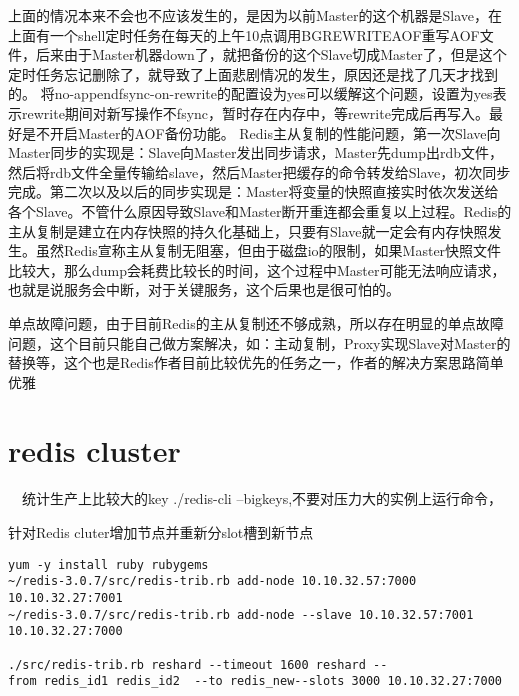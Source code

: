 上面的情况本来不会也不应该发生的，是因为以前Master的这个机器是Slave，在上面有一个shell定时任务在每天的上午10点调用BGREWRITEAOF重写AOF文件，后来由于Master机器down了，就把备份的这个Slave切成Master了，但是这个定时任务忘记删除了，就导致了上面悲剧情况的发生，原因还是找了几天才找到的。
将no-appendfsync-on-rewrite的配置设为yes可以缓解这个问题，设置为yes表示rewrite期间对新写操作不fsync，暂时存在内存中，等rewrite完成后再写入。最好是不开启Master的AOF备份功能。
Redis主从复制的性能问题，第一次Slave向Master同步的实现是：Slave向Master发出同步请求，Master先dump出rdb文件，然后将rdb文件全量传输给slave，然后Master把缓存的命令转发给Slave，初次同步完成。第二次以及以后的同步实现是：Master将变量的快照直接实时依次发送给各个Slave。不管什么原因导致Slave和Master断开重连都会重复以上过程。Redis的主从复制是建立在内存快照的持久化基础上，只要有Slave就一定会有内存快照发生。虽然Redis宣称主从复制无阻塞，但由于磁盘io的限制，如果Master快照文件比较大，那么dump会耗费比较长的时间，这个过程中Master可能无法响应请求，也就是说服务会中断，对于关键服务，这个后果也是很可怕的。

单点故障问题，由于目前Redis的主从复制还不够成熟，所以存在明显的单点故障问题，这个目前只能自己做方案解决，如：主动复制，Proxy实现Slave对Master的替换等，这个也是Redis作者目前比较优先的任务之一，作者的解决方案思路简单优雅


\section{redis cluster}

  统计生产上比较大的key ./redis-cli --bigkeys,不要对压力大的实例上运行命令，

针对Redis cluter增加节点并重新分slot槽到新节点
\begin{lstlisting}
yum -y install ruby rubygems
~/redis-3.0.7/src/redis-trib.rb add-node 10.10.32.57:7000 10.10.32.27:7001
~/redis-3.0.7/src/redis-trib.rb add-node --slave 10.10.32.57:7001 10.10.32.27:7000
 
./src/redis-trib.rb reshard --timeout 1600 reshard --from redis_id1 redis_id2  --to redis_new--slots 3000 10.10.32.27:7000
 
\end{lstlisting}
